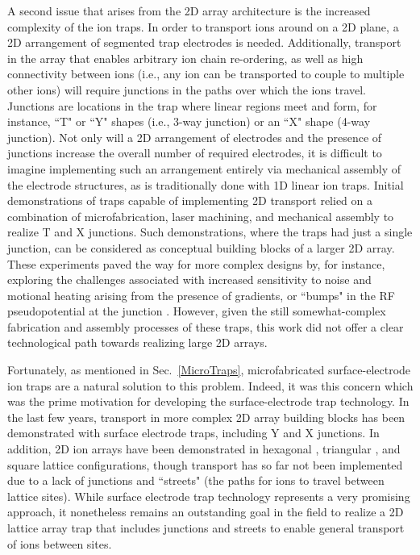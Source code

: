 \documentclass[%
reprint,
 amsmath,amssymb,
]{revtex4-1}
\begin{document}
A second issue that arises from the 2D array architecture is the increased complexity of the ion traps. In order to transport ions around on a 2D plane, a 2D arrangement of segmented trap electrodes is needed.  Additionally, transport in the array that enables arbitrary ion chain re-ordering, as well as high connectivity between ions (i.e., any ion can be transported to couple to multiple other ions) will require junctions in the paths over which the ions travel.  Junctions are locations in the trap where linear regions meet and form, for instance, ``T" or ``Y" shapes (i.e., 3-way junction) or an ``X" shape (4-way junction). Not only will a 2D arrangement of electrodes and the presence of junctions increase the overall number of required electrodes, it is difficult to imagine implementing such an arrangement entirely via mechanical assembly of the electrode structures, as is traditionally done with 1D linear ion traps.  Initial demonstrations of traps capable of implementing 2D transport relied on a combination of microfabrication, laser machining, and mechanical assembly to realize T \cite{HensingerTJunction2006} and X \cite{blakestad_junction_2009} junctions.  Such demonstrations, where the traps had just a single junction, can be considered as conceptual building blocks of a larger 2D array. These experiments paved the way for more complex designs by, for instance, exploring the challenges associated with increased sensitivity to noise and motional heating arising from the presence of gradients, or ``bumps" in the RF pseudopotential at the junction \cite{PhysRevA.78.063410}.   However, given the still somewhat-complex  fabrication and assembly processes of these traps, this work did not offer a clear technological path towards realizing large 2D arrays.

Fortunately, as mentioned in Sec.~\ref{MicroTraps}, microfabricated surface-electrode ion traps are a natural solution to this problem.  Indeed, it was this concern which was the prime motivation for developing the surface-electrode trap technology. In the last few years, transport in more complex 2D array building blocks has been demonstrated with surface electrode traps, including Y \cite{amini_racetrack, sandia_junction_2011} and X \cite{WrightXJunction2013} junctions.  In addition, 2D ion arrays have been demonstrated in hexagonal \cite{Sterling2014}, triangular \cite{Mielenz2016}, and square \cite{BruzewiczArrayLoading2016} lattice configurations, though transport has so far not been implemented due to a lack of junctions and ``streets" (the paths for ions to travel between lattice sites).  While surface electrode trap technology represents a very promising approach, it nonetheless remains an outstanding goal in the field to realize a 2D lattice array trap that includes junctions and streets to enable general transport of ions between sites.
\end{document}
